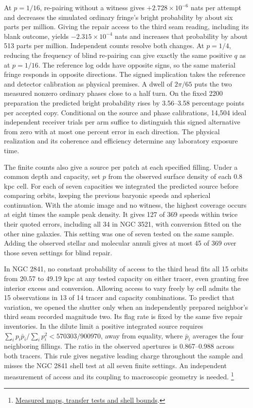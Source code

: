 \documentclass[11pt]{article}
\begin{document}
At $p=1/16$, re-pairing without a witness gives
$+2.728\times10^{-6}$ nats per attempt and decreases the simulated
ordinary fringe's bright probability by about six parts per million.
Giving the repair access to the third seam reading, including its
blank outcome, yields $-2.315\times10^{-4}$ nats and increases that
probability by about 513 parts per million. Independent counts
resolve both changes. At $p=1/4$, reducing the frequency of blind
re-pairing can give exactly the same positive $q$ as at $p=1/16$.
The reference log odds have opposite signs, so the same material
fringe responds in opposite directions. The signed implication
takes the reference and detector calibration as physical premises.
A dwell of $2\pi/65$ puts the two measured nonzero ordinary phases
close to a half turn. On the fixed 2200 preparation the predicted
bright probability rises by 3.56--3.58 percentage points per
accepted copy. Conditional on the source and phase calibrations,
14,504 ideal independent receiver trials per arm suffice to
distinguish this signed alternative from zero with at most one
percent error in each direction. The physical realization and its
coherence and efficiency determine any laboratory exposure time.

The finite counts also give a source per patch at each specified
filling. Under a common depth and capacity, set $p$ from the
observed surface density of each 0.8 kpc cell. For each of seven
capacities we integrated the predicted source before comparing
orbits, keeping the previous baryonic speeds and spherical
continuation. With the atomic image and no witness, the highest
coverage occurs at eight times the sample peak density. It gives
127 of 369 speeds within twice their quoted errors, including all
34 in NGC 3521, with conversion fitted on the other nine galaxies.
This setting was one of seven tested on the same sample. Adding the
observed stellar and molecular annuli gives at most 45 of 369 over
those seven settings for blind repair.

In NGC 2841, no constant probability of access to the third head
fits all 15 orbits from 20.57 to 49.19 kpc at any tested capacity
on either tracer, even granting free interior excess and conversion.
Allowing access to vary freely by cell admits the 15 observations in
13 of 14 tracer and capacity combinations. To predict that variation,
we opened the shutter only when an independently prepared neighbor's
third seam recorded magnitude two. Its flag rate is fixed by the
same five repair inventories. In the dilute limit a positive
integrated source requires
$\sum_i p_i\bar p_i/\sum_i p_i^2 <570303/900970$, away from equality,
where $\bar p_i$ averages the four neighboring fillings. The ratio
in the observed apertures is 0.867--0.988 across both tracers.
This rule gives negative leading charge throughout the sample and
misses the NGC 2841 shell test at all seven finite settings. An
independent measurement of access and its coupling to macroscopic
geometry is needed.%
\footnote{\href{https://github.com/FloatingPragma/observer-patch-holography/tree/main/code/cosmology/paid_trail_bao}{Measured maps, transfer tests and shell bounds}.}
\end{document}
